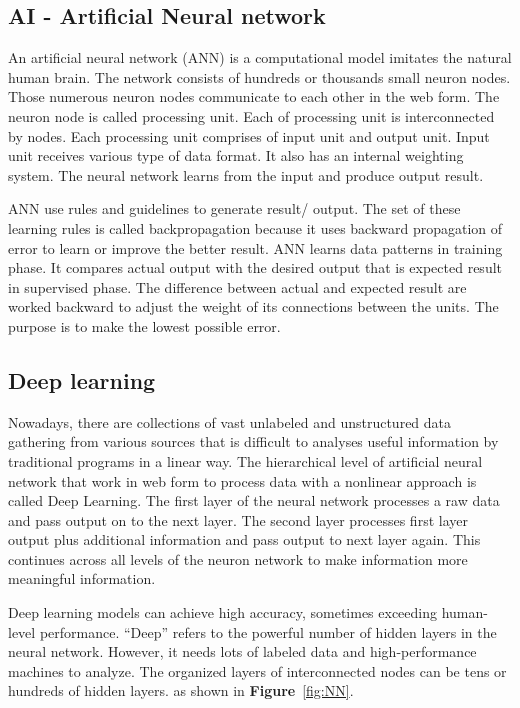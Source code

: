 \documentclass[12pt,oneside,openright,a4paper]{cpe-english-project}
\begin{document}
\subsection{AI - Artificial Neural network}
\hspace{10mm}An artificial neural network (ANN) is a computational model imitates the natural human brain. The network consists of hundreds or thousands small neuron nodes. Those numerous neuron nodes communicate to each other in the web form. The neuron node is called processing unit. Each of processing unit is interconnected by nodes. Each processing unit comprises of input unit and output unit. Input unit receives various type of data format. It also has an internal weighting system. The neural network learns from the input and produce output result.

\hspace{10mm}ANN use rules and guidelines to generate result/ output. The set of these learning rules is called backpropagation because it uses backward propagation of error to learn or improve the better result. ANN learns data patterns in training phase. It compares actual output with the desired output that is expected result in supervised phase. The difference between actual and expected result are worked backward to adjust the weight of its connections between the units. The purpose is to make the lowest possible error. \cite{ann}

\subsection{Deep learning}
\hspace{10mm}Nowadays, there are collections of vast unlabeled and unstructured data gathering from various sources that is difficult to analyses useful information by traditional programs in a linear way.  The hierarchical level of artificial neural network that work in web form to process data with a nonlinear approach is called Deep Learning.  The first layer of the neural network processes a raw data and pass output on to the next layer. The second layer processes first layer output plus additional information and pass output to next layer again. This continues across all levels of the neuron network to make information more meaningful information. \cite{deepLearning}

\hspace{10mm}Deep learning models can achieve high accuracy, sometimes exceeding human-level performance. “Deep” refers to the powerful number of hidden layers in the neural network.  However, it needs lots of labeled data and high-performance machines to analyze. The organized layers of interconnected nodes can be tens or hundreds of hidden layers. \cite{deepLearning2} as shown in \textbf{Figure}~\ref{fig:NN}.
\end{document}
